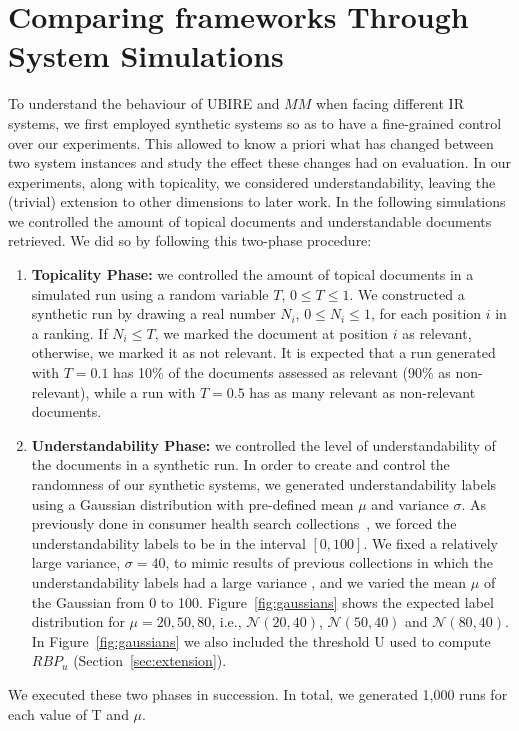



\section{Comparing frameworks Through System Simulations}
\label{sec:simulations}

To understand the behaviour of UBIRE and $MM$ when facing different IR systems, we first employed synthetic systems so as to have a fine-grained control over our experiments. This allowed to know a priori what has changed between two system instances and study the effect these changes had on evaluation. In our experiments, along with topicality, we considered understandability, leaving the (trivial) extension to other dimensions to later work. 
In the following simulations we controlled the amount of topical documents and understandable documents retrieved. We did so by following this two-phase procedure:

\begin{enumerate}
\item \textbf{Topicality Phase:} we controlled the amount of topical documents in a simulated run using a random variable $T$, $0 \le T \le 1$. 
We constructed a synthetic run by drawing a real number $N_i$, $0 \le N_i \le 1$, for each position $i$ in a ranking. If $N_i \le T$, we marked the document at position $i$ as relevant, otherwise, we marked it as not relevant. It is expected that a run generated with $T=0.1$ has 10\% of the documents assessed as relevant (90\% as non-relevant), while a run with $T=0.5$ has as many relevant as non-relevant documents. 

\item \textbf{Understandability Phase:}  we controlled the level of understandability of the documents in a synthetic run. In order to create and control the randomness of our synthetic systems, we generated understandability labels using a Gaussian distribution with pre-defined mean $\mu$ and variance $\sigma$. 
As previously done in consumer health search collections~\cite{clefIR16,clefIR17}, we forced the understandability labels to be in the interval $[0,100]$. 
We fixed a relatively large variance, $\sigma=40$, to mimic results of previous collections in which the understandability labels had a large variance \cite{clefIR16}, and we varied the mean $\mu$ of the Gaussian from 0 to 100. Figure~\ref{fig:gaussians} shows the expected label distribution for $\mu=20, 50, 80$, i.e., $\mathcal{N}(20, 40)$, $\mathcal{N}(50, 40)$ and $\mathcal{N}(80, 40)$.
In Figure~\ref{fig:gaussians} we also included the threshold U used to compute $RBP_u$ (Section~\ref{sec:extension}).
\end{enumerate}
%
We executed these two phases in succession. In total, we generated 1,000 runs for each value of T and $\mu$. 

